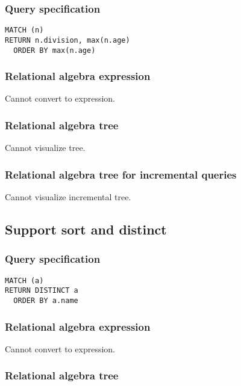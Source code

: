\subsubsection*{Query specification}

\begin{lstlisting}
MATCH (n)
RETURN n.division, max(n.age)
  ORDER BY max(n.age)
\end{lstlisting}

\subsubsection*{Relational algebra expression}

Cannot convert to expression.

\subsubsection*{Relational algebra tree}

Cannot visualize tree.

\subsubsection*{Relational algebra tree for incremental queries}

Cannot visualize incremental tree.

\subsection{Support sort and distinct}

\subsubsection*{Query specification}

\begin{lstlisting}
MATCH (a)
RETURN DISTINCT a
  ORDER BY a.name
\end{lstlisting}

\subsubsection*{Relational algebra expression}

Cannot convert to expression.

\subsubsection*{Relational algebra tree}

